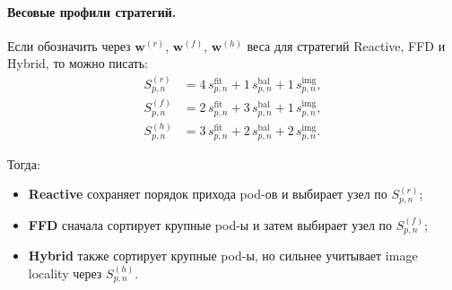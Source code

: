 \documentclass[11pt]{article}
\begin{document}
\paragraph{Весовые профили стратегий.}
Если обозначить через \(\mathbf{w}^{(r)}\), \(\mathbf{w}^{(f)}\),
\(\mathbf{w}^{(h)}\) веса для стратегий Reactive, FFD и Hybrid, то можно писать:
\begin{align*}
  S_{p,n}^{(r)}
  &=
  4\,s_{p,n}^{\text{fit}}
  +
  1\,s_{p,n}^{\text{bal}}
  +
  1\,s_{p,n}^{\text{img}}, \\
  S_{p,n}^{(f)}
  &=
  2\,s_{p,n}^{\text{fit}}
  +
  3\,s_{p,n}^{\text{bal}}
  +
  1\,s_{p,n}^{\text{img}}, \\
  S_{p,n}^{(h)}
  &=
  3\,s_{p,n}^{\text{fit}}
  +
  2\,s_{p,n}^{\text{bal}}
  +
  2\,s_{p,n}^{\text{img}}.
\end{align*}

Тогда:
\begin{itemize}
  \item \textbf{Reactive} сохраняет порядок прихода pod-ов и выбирает узел по \(S_{p,n}^{(r)}\);
  \item \textbf{FFD} сначала сортирует крупные pod-ы и затем выбирает узел по \(S_{p,n}^{(f)}\);
  \item \textbf{Hybrid} также сортирует крупные pod-ы, но сильнее учитывает image locality через \(S_{p,n}^{(h)}\).
\end{itemize}
\end{document}
